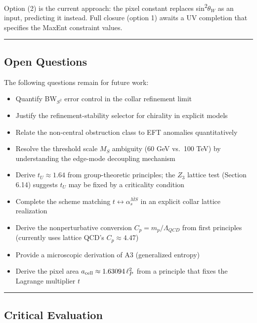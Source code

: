 \documentclass[11pt,a4paper]{article}
\theoremstyle{remark}
\providecommand{\tightlist}{%
  \setlength{\itemsep}{0pt}\setlength{\parskip}{0pt}}
\begin{document}
Option (2) is the current approach: the pixel constant replaces sin\textsuperscript{2}\(\theta_W\) as an input, predicting it instead. Full closure (option 1) awaits a UV completion that specifies the MaxEnt constraint values.

\begin{center}\rule{0.5\linewidth}{0.5pt}\end{center}

\subsection{Open Questions}\label{open-questions}

The following questions remain for future work:

\begin{itemize}
\tightlist
\item
  Quantify BW\(_{S^2}\) error control in the collar refinement limit
\item
  Justify the refinement-stability selector for chirality in explicit models
\item
  Relate the non-central obstruction class to EFT anomalies quantitatively
\item
  Resolve the threshold scale \(M_S\) ambiguity (60 GeV vs.~100 TeV) by understanding the edge-mode decoupling mechanism
\item
  Derive \(t_U \approx 1.64\) from group-theoretic principles; the \(Z_3\) lattice test (Section 6.14) suggests \(t_U\) may be fixed by a criticality condition
\item
  Complete the scheme matching \(t \leftrightarrow \alpha_s^{\overline{MS}}\) in an explicit collar lattice realization
\item
  Derive the nonperturbative conversion \(C_p = m_p/\Lambda_{QCD}\) from first principles (currently uses lattice QCD's \(C_p \approx 4.47\))
\item
  Provide a microscopic derivation of A3 (generalized entropy)
\item
  Derive the pixel area \(a_{\rm cell} \approx 1.63094\,\ell_P^2\) from a principle that fixes the Lagrange multiplier \(t\)
\end{itemize}

\begin{center}\rule{0.5\linewidth}{0.5pt}\end{center}

\subsection{Critical Evaluation}\label{critical-evaluation}
\end{document}
